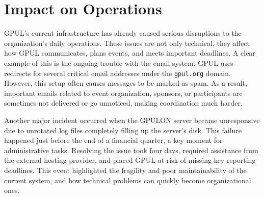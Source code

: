\section{Impact on Operations}

GPUL's current infrastructure has already caused serious disruptions to the organization's daily operations. These issues are not only technical, they affect how GPUL communicates, plans events, and meets important deadlines. A clear example of this is the ongoing trouble with the email system. GPUL uses redirects for several critical email addresses under the \texttt{gpul.org} domain. However, this setup often causes messages to be marked as spam. As a result, important emails related to event organization, sponsors, or participants are sometimes not delivered or go unnoticed, making coordination much harder.

Another major incident occurred when the GPULON server became unresponsive due to unrotated log files completely filling up the server's disk. This failure happened just before the end of a financial quarter, a key moment for administrative tasks. Resolving the issue took four days, required assistance from the external hosting provider, and placed GPUL at risk of missing key reporting deadlines. This event highlighted the fragility and poor maintainability of the current system, and how technical problems can quickly become organizational ones.

